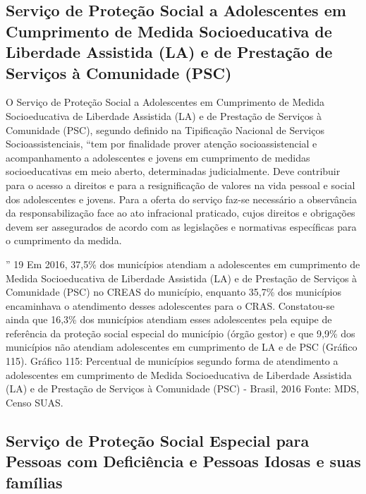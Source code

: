 \documentclass[
  brazilian]{report}
\begin{document}
\hypertarget{serviuxe7o-de-proteuxe7uxe3o-social-a-adolescentes-em-cumprimento-de-medida-socioeducativa-de-liberdade-assistida-la-e-de-prestauxe7uxe3o-de-serviuxe7os-uxe0-comunidade-psc}{%
\subsection{Serviço de Proteção Social a Adolescentes em Cumprimento de
Medida Socioeducativa de Liberdade Assistida (LA) e de Prestação de
Serviços à Comunidade
(PSC)}\label{serviuxe7o-de-proteuxe7uxe3o-social-a-adolescentes-em-cumprimento-de-medida-socioeducativa-de-liberdade-assistida-la-e-de-prestauxe7uxe3o-de-serviuxe7os-uxe0-comunidade-psc}}

O Serviço de Proteção Social a Adolescentes em Cumprimento de Medida
Socioeducativa de Liberdade Assistida (LA) e de Prestação de Serviços à
Comunidade (PSC), segundo definido na Tipificação Nacional de Serviços
Socioassistenciais, ``tem por finalidade prover atenção
socioassistencial e acompanhamento a adolescentes e jovens em
cumprimento de medidas socioeducativas em meio aberto, determinadas
judicialmente. Deve contribuir para o acesso a direitos e para a
resignificação de valores na vida pessoal e social dos adolescentes e
jovens. Para a oferta do serviço faz-se necessário a observância da
responsabilização face ao ato infracional praticado, cujos direitos e
obrigações devem ser assegurados de acordo com as legislações e
normativas específicas para o cumprimento da medida.

'' 19 Em 2016, 37,5\% dos municípios atendiam a adolescentes em
cumprimento de Medida Socioeducativa de Liberdade Assistida (LA) e de
Prestação de Serviços à Comunidade (PSC) no CREAS do município, enquanto
35,7\% dos municípios encaminhava o atendimento desses adolescentes para
o CRAS. Constatou-se ainda que 16,3\% dos municípios atendiam esses
adolescentes pela equipe de referência da proteção social especial do
município (órgão gestor) e que 9,9\% dos municípios não atendiam
adolescentes em cumprimento de LA e de PSC (Gráfico 115). Gráfico 115:
Percentual de municípios segundo forma de atendimento a adolescentes em
cumprimento de Medida Socioeducativa de Liberdade Assistida (LA) e de
Prestação de Serviços à Comunidade (PSC) - Brasil, 2016 Fonte: MDS,
Censo SUAS.

\hypertarget{serviuxe7o-de-proteuxe7uxe3o-social-especial-para-pessoas-com-deficiuxeancia-e-pessoas-idosas-e-suas-famuxedlias}{%
\subsection{Serviço de Proteção Social Especial para Pessoas com
Deficiência e Pessoas Idosas e suas
famílias}\label{serviuxe7o-de-proteuxe7uxe3o-social-especial-para-pessoas-com-deficiuxeancia-e-pessoas-idosas-e-suas-famuxedlias}}
\end{document}
